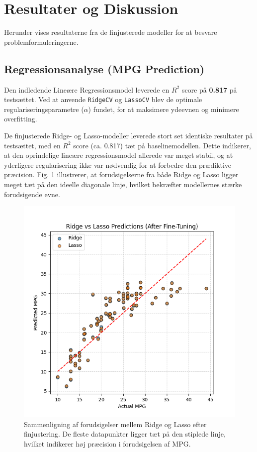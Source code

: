 \documentclass{article}
\begin{document}
\section{Resultater og Diskussion}

Herunder vises resultaterne fra de finjusterede modeller for at besvare problemformuleringerne.

\subsection{Regressionsanalyse (MPG Prediction)}

Den indledende Lineære Regressionsmodel leverede en $R^2$ score på \textbf{0.817} på testsættet. 
Ved at anvende \texttt{RidgeCV} og \texttt{LassoCV} blev de optimale regulariseringsparametre (\(\alpha\)) fundet, for at maksimere ydeevnen og minimere overfitting.

De finjusterede Ridge- og Lasso-modeller leverede stort set identiske resultater på testsættet, med en $R^2$ score (ca. 0.817) tæt på baselinemodellen. 
Dette indikerer, at den oprindelige lineære regressionsmodel allerede var meget stabil, og at yderligere regularisering ikke var nødvendig for at forbedre den prædiktive præcision. 
Fig. 1 illustrerer, at forudsigelserne fra både Ridge og Lasso ligger meget tæt på den ideelle diagonale linje, hvilket bekræfter modellernes stærke forudsigende evne.

\begin{figure}[h]
    \centering
    \includegraphics[width=0.75\columnwidth]{../models/ridge_vs_lasso_after_finetuning.png}
    \caption{Sammenligning af forudsigelser mellem Ridge og Lasso efter finjustering. De fleste datapunkter ligger tæt på den stiplede linje, hvilket indikerer høj præcision i forudsigelsen af MPG.}
    \label{fig:regression}
\end{figure}
\end{document}
